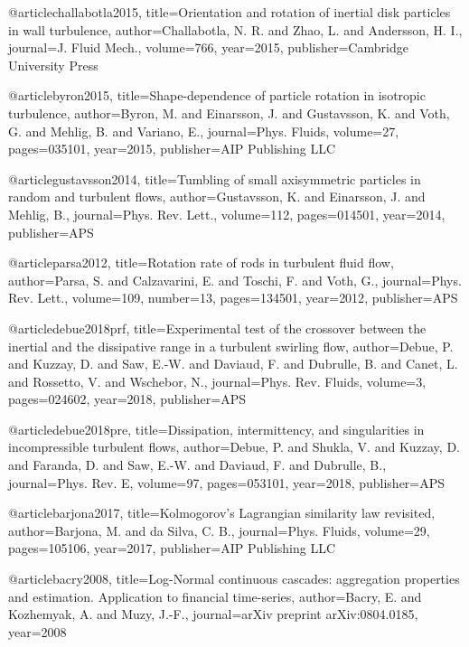 @article{challabotla2015,
  title={Orientation and rotation of inertial disk particles in wall turbulence},
  author={Challabotla, N. R. and Zhao, L. and Andersson, H. I.},
  journal={J. Fluid Mech.},
  volume={766},
  year={2015},
  publisher={Cambridge University Press}
}

@article{byron2015,
  title={Shape-dependence of particle rotation in isotropic turbulence},
  author={Byron, M. and Einarsson, J. and Gustavsson, K. and Voth, G. and Mehlig, B. and Variano, E.},
  journal={Phys. Fluids},
  volume={27},
  pages={035101},
  year={2015},
  publisher={AIP Publishing LLC}
}

@article{gustavsson2014,
  title={Tumbling of small axisymmetric particles in random and turbulent flows},
  author={Gustavsson, K. and Einarsson, J. and Mehlig, B.},
  journal={Phys. Rev. Lett.},
  volume={112},
  pages={014501},
  year={2014},
  publisher={APS}
}

@article{parsa2012,
  title={Rotation rate of rods in turbulent fluid flow},
  author={Parsa, S. and Calzavarini, E. and Toschi, F. and Voth, G.},
  journal={Phys. Rev. Lett.},
  volume={109},
  number={13},
  pages={134501},
  year={2012},
  publisher={APS}
}

@article{debue2018prf,
  title={{Experimental test of the crossover between the inertial and the dissipative range in a turbulent swirling flow}},
  author={Debue, P. and Kuzzay, D. and Saw, E.-W. and Daviaud, F. and Dubrulle, B. and Canet, L. and Rossetto, V. and Wschebor, N.},
  journal={Phys. Rev. Fluids},
  volume={3},
  pages={024602},
  year={2018},
  publisher={APS}
}

@article{debue2018pre,
  title={Dissipation, intermittency, and singularities in incompressible turbulent flows},
  author={Debue, P. and Shukla, V. and Kuzzay, D. and Faranda, D. and Saw, E.-W. and Daviaud, F. and Dubrulle, B.},
  journal={Phys. Rev. E},
  volume={97},
  pages={053101},
  year={2018},
  publisher={APS}
}

@article{barjona2017,
  title={{Kolmogorov's Lagrangian similarity law revisited}},
  author={Barjona, M. and da Silva, C. B.},
  journal={Phys. Fluids},
  volume={29},
  pages={105106},
  year={2017},
  publisher={AIP Publishing LLC}
}

@article{bacry2008,
  title={{Log-Normal continuous cascades: aggregation properties and estimation. Application to financial time-series}},
  author={Bacry, E. and Kozhemyak, A. and Muzy, J.-F.},
  journal={arXiv preprint arXiv:0804.0185},
  year={2008}
}

